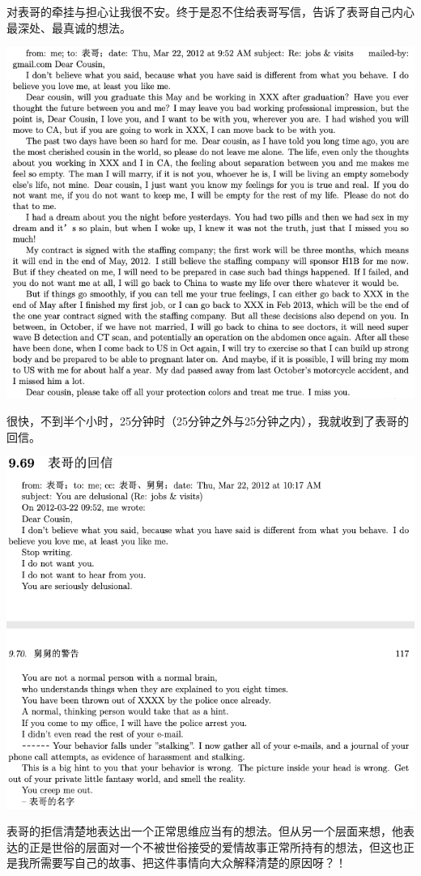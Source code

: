 \documentclass[9pt, b5paper]{article}
\begin{document}
对表哥的牵挂与担心让我很不安。终于是忍不住给表哥写信，告诉了表哥自己内心最深处、最真诚的想法。 

\begin{center}
\includegraphics[width=.9\linewidth]{./pic/p1p116.png}
\end{center}

很快，不到半个小时，25分钟时（25分钟之外与25分钟之内），我就收到了表哥的回信。

\begin{center}
\includegraphics[width=.9\linewidth]{./pic/p1p117.png}
\end{center}

表哥的拒信清楚地表达出一个正常思维应当有的想法。但从另一个层面来想，他表达的正是世俗的层面对一个不被世俗接受的爱情故事正常所持有的想法，但这也正是我所需要写自己的故事、把这件事情向大众解释清楚的原因呀？！
\end{document}
